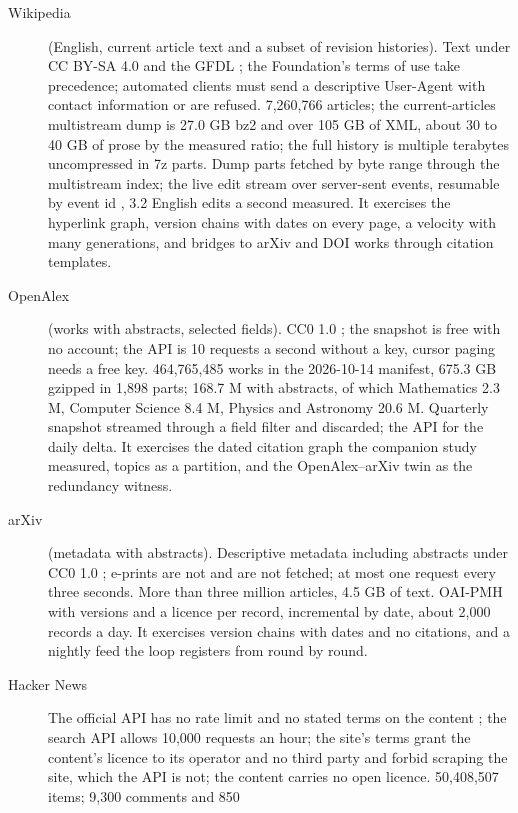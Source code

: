 \documentclass[11pt]{article}
\theoremstyle{plain}
\theoremstyle{definition}
\theoremstyle{remark}
\begin{document}
\begin{description}
  \item[Wikipedia] (English, current article text and a subset of revision histories). Text under
    CC BY-SA 4.0 and the GFDL \citep{wikimedia2026legal}; the Foundation's terms of use take
    precedence; automated clients must send a descriptive User-Agent with contact information or
    are refused. 7,260,766 articles; the current-articles multistream dump is 27.0 GB bz2 and over
    105 GB of XML, about 30 to 40 GB of prose by the measured ratio; the full history is multiple
    terabytes uncompressed in 7z parts. Dump parts fetched by byte range through the multistream
    index; the live edit stream over server-sent events, resumable by event id
    \citep{wikimedia2026eventstreams}, 3.2 English edits a second measured. It exercises the
    hyperlink graph, version chains with dates on every page, a velocity with many generations,
    and bridges to arXiv and DOI works through citation templates.
  \item[OpenAlex] (works with abstracts, selected fields). CC0 1.0 \citep{openalex2026snapshot,
    priem2022openalex}; the snapshot is free with no account; the API is 10 requests a second
    without a key, cursor paging needs a free key. 464,765,485 works in the 2026-10-14 manifest,
    675.3 GB gzipped in 1,898 parts; 168.7 M with abstracts, of which Mathematics 2.3 M, Computer
    Science 8.4 M, Physics and Astronomy 20.6 M. Quarterly snapshot streamed through a field filter
    and discarded; the API for the daily delta. It exercises the dated citation graph the companion
    study measured, topics as a partition, and the OpenAlex–arXiv twin as the redundancy witness.
  \item[arXiv] (metadata with abstracts). Descriptive metadata including abstracts under CC0 1.0
    \citep{arxiv2026tou}; e-prints are not and are not fetched; at most one request every three
    seconds. More than three million articles, 4.5 GB of text. OAI-PMH with versions and a licence
    per record, incremental by date, about 2,000 records a day. It exercises version chains with
    dates and no citations, and a nightly feed the loop registers from round by round.
  \item[Hacker News] The official API has no rate limit and no stated terms on the content
    \citep{hn2026api}; the search API allows 10,000 requests an hour; the site's terms grant the
    content's licence to its operator and no third party and forbid scraping the site, which the
    API is not; the content carries no open licence. 50,408,507 items; 9,300 comments and 850

\end{description}
\end{document}
